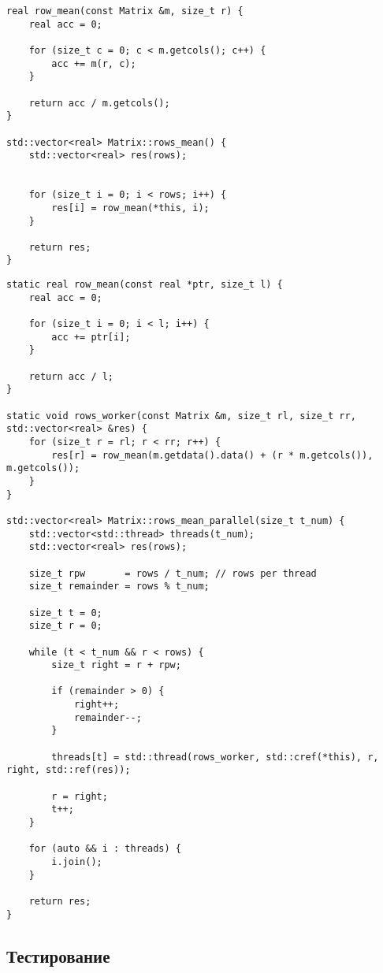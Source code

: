 \begin{lstlisting}[caption=Последовательный алгоритм, label=list:iter, language={}]
real row_mean(const Matrix &m, size_t r) {
	real acc = 0;

	for (size_t c = 0; c < m.getcols(); c++) {
		acc += m(r, c);
	}

	return acc / m.getcols();
}

std::vector<real> Matrix::rows_mean() {
	std::vector<real> res(rows);


	for (size_t i = 0; i < rows; i++) {
		res[i] = row_mean(*this, i);
	}

	return res;
}
\end{lstlisting}

\begin{lstlisting}[caption=Параллельный алгоритм, label=list:iter, language={}]
static real row_mean(const real *ptr, size_t l) {
    real acc = 0;

    for (size_t i = 0; i < l; i++) {
        acc += ptr[i];
    }

    return acc / l;
}

static void rows_worker(const Matrix &m, size_t rl, size_t rr, std::vector<real> &res) {
    for (size_t r = rl; r < rr; r++) {
        res[r] = row_mean(m.getdata().data() + (r * m.getcols()), m.getcols());
    }
}

std::vector<real> Matrix::rows_mean_parallel(size_t t_num) {
    std::vector<std::thread> threads(t_num);
    std::vector<real> res(rows);

    size_t rpw       = rows / t_num; // rows per thread
    size_t remainder = rows % t_num;

    size_t t = 0;
    size_t r = 0;

    while (t < t_num && r < rows) {
        size_t right = r + rpw;

        if (remainder > 0) {
            right++;
            remainder--;
        }

        threads[t] = std::thread(rows_worker, std::cref(*this), r, right, std::ref(res));
        
        r = right;
        t++;
    }

    for (auto && i : threads) {
        i.join();
    }

    return res;
}
\end{lstlisting}

\subsection{Тестирование}

